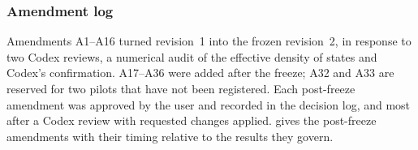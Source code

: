 \subsubsection{Amendment log}
\label{sec:m-reg-amendments}

Amendments A1--A16 turned revision~1 into the frozen revision~2, in response to two Codex reviews, a numerical audit of
the effective density of states and Codex's confirmation. %
A17--A36 were added after the freeze; A32 and A33 are reserved for two pilots that have not been registered. %
Each post-freeze amendment was approved by the user and recorded in the decision log, and most after a Codex review
with requested changes applied.  gives the post-freeze amendments with their timing relative to
the results they govern.

